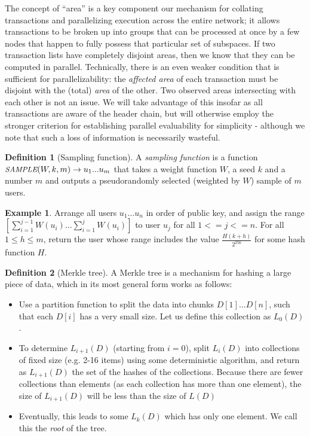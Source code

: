 \documentclass[11pt,a4paper]{article}
\makeatletter
\theoremstyle{plain}
\theoremstyle{definition}
\newtheorem{defn}{Definition}[section]
\newtheorem{exmp}{Example}[section]
\theoremstyle{remark}
\newcommand{\eg}{e.g.\@\xspace}
\newcommand{\makeintoafunction}[1]{\textit{\uppercase{\small #1}}}
\newcommand{\SAMPLE}{\makeintoafunction{sample}}
\makeatother
\begin{document}
The concept of ``area'' is a key component our mechanism for collating transactions and parallelizing execution across the entire network; it allows transactions to be broken up into groups that can be processed at once by a few nodes that happen to fully possess that particular set of subspaces. If two transaction lists have completely disjoint areas, then we know that they can be computed in parallel. Technically, there is an even weaker condition that is sufficient for parallelizability: the \emph{affected area} of each transaction must be disjoint with the (total) \emph{area} of the other. Two observed areas intersecting with each other is not an issue. We will take advantage of this insofar as all transactions are aware of the header chain, but will otherwise employ the stronger criterion for establishing parallel evaluability for simplicity - although we note that such a loss of information is necessarily wasteful.

\begin{defn}[Sampling function]
A \emph{sampling function} is a function $\SAMPLE(W, k, m) \rightarrow {u_1 ... u_m}$ that takes a weight function $W$, a seed $k$ and a number $m$ and outputs a pseudorandomly selected (weighted by $W$) sample of $m$ users.
\end{defn}

\begin{exmp}
Arrange all users $u_1 ... u_n$ in order of public key, and assign the range $[\sum_{i=1}^{j-1} W(u_i)...\sum_{i=1}^j W(u_i)]$ to user $u_j$ for all $1 <= j <= n$. For all $1 \le h \le m$, return the user whose range includes the value $\frac{H(k + h)}{2^{256}}$ for some hash function $H$.
\end{exmp}

\begin{defn}[Merkle tree]
A Merkle tree\cite{merkle} is a mechanism for hashing a large piece of data, which in its most general form works as follows:
\begin{itemize}
\item
Use a partition function to split the data into chunks $D[1] ... D[n]$, such that each $D[i]$ has a very small size. Let us define this collection as $L_0(D)$.
\item
To determine $L_{i+1}(D)$ (starting from $i = 0$), split $L_i(D)$ into collections of fixed size (\eg 2-16 items) using some deterministic algorithm, and return as $L_{i+1}(D)$ the set of the hashes of the collections. Because there are fewer collections than elements (as each collection has more than one element), the size of $L_{i+1}(D)$ will be less than the size of $L(D)$
\item
Eventually, this leads to some $L_k(D)$ which has only one element. We call this the \emph{root} of the tree.
\end{itemize}
\end{defn}
\end{document}
